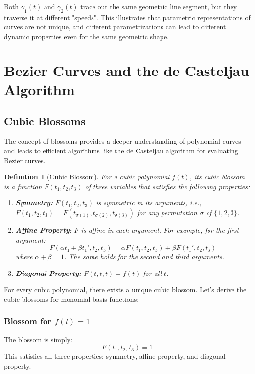 \documentclass{article}
\newtheorem{definition}{Definition}
\begin{document}
Both \(\gamma_1(t)\) and \(\gamma_2(t)\) trace out the same geometric line segment, but they traverse it at different "speeds". This illustrates that parametric representations of curves are not unique, and different parametrizations can lead to different dynamic properties even for the same geometric shape.


\section{Bezier Curves and the de Casteljau Algorithm}

\subsection{Cubic Blossoms}

The concept of blossoms provides a deeper understanding of polynomial curves and leads to efficient algorithms like the de Casteljau algorithm for evaluating Bezier curves.

\begin{definition}[Cubic Blossom]
For a cubic polynomial \(f(t)\), its cubic blossom is a function \(F(t_1, t_2, t_3)\) of three variables that satisfies the following properties:
\begin{enumerate}
    \item \textbf{Symmetry:} \(F(t_1, t_2, t_3)\) is symmetric in its arguments, i.e., \(F(t_1, t_2, t_3) = F(t_{\sigma(1)}, t_{\sigma(2)}, t_{\sigma(3)})\) for any permutation \(\sigma\) of \(\{1, 2, 3\}\).
    \item \textbf{Affine Property:} \(F\) is affine in each argument. For example, for the first argument:
    \[ F(\alpha t_1 + \beta t_1', t_2, t_3) = \alpha F(t_1, t_2, t_3) + \beta F(t_1', t_2, t_3) \]
    where \(\alpha + \beta = 1\). The same holds for the second and third arguments.
    \item \textbf{Diagonal Property:} \(F(t, t, t) = f(t)\) for all \(t\).
\end{enumerate}
\end{definition}

For every cubic polynomial, there exists a unique cubic blossom. Let's derive the cubic blossoms for monomial basis functions:

\subsubsection{Blossom for \(f(t) = 1\)}
The blossom is simply:
\[ F(t_1, t_2, t_3) = 1 \]
This satisfies all three properties: symmetry, affine property, and diagonal property.
\end{document}
